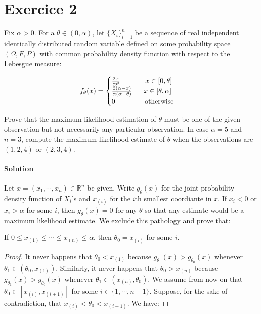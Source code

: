 \documentclass[../main.tex]{subfiles}
\begin{document}
\section{Exercice 2}
\begin{CJK*}{UTF8}{gbsn}
Fix $\alpha > 0$. For a $\theta \in (0, \alpha)$,
let $\{X_i\}_{i=1}^n$ be a sequence of real independent identically distributed random variable 
defined on some probability space $(\Omega, F, P)$
with common probability density function with respect to the Lebesgue measure:

\begin{equation*}
    f_{\theta}(x) = 
    \begin{cases}
        \frac{2x}{\alpha \theta} \tab[1.3cm] x \in [0, \theta] \\
        \frac{2(\alpha-x)}{\alpha(\alpha - \theta)} \tab[0.6cm] x \in [\theta, \alpha] \\
        0 \tab[1.5cm] \text{otherwise}
    \end{cases}
\end{equation*}

Prove that the maximum likelihood estimation of $\theta$ must be one of the given observation
but not necessarily any particular observation. 
In case $\alpha = 5$ and $n=3$, compute the maximum likelihood estimate of $\theta$ when the 
observations are $(1,2,4)$ or $(2,3,4)$.  

\smallskip
\paragraph{Solution}
Let $x = (x_1, \cdots, x_n) \in \mathbb{R}^n$ be given. 
Write $g_{\theta}(x)$ for the joint probability density function of $X_i$'s 
and $x_{(i)}$ for the $i$th smallest coordiante in $x$.
If $x_i < 0$ or $x_i > \alpha$ for some $i$, then $g_{\theta}(x)=0$ for any $\theta$ so that 
any estimate would be a maximum likelihood estimate.
We exclude this pathology and prove that:

\begin{theorem}
If $0 \leqslant x_{(1)} \leqslant \cdots \leqslant x_{(n)} \leqslant \alpha$, then $\theta_0 = x_{(i)}$ for some $i$.
\end{theorem}

\begin{proof}
It never happens that $\theta_0 < x_{(1)}$
because $g_{\theta_1}(x) > g_{\theta_0}(x)$ whenever $\theta_1 \in (\theta_0,x_{(1)})$.
Similarly, it never happens that $\theta_0 > x_{(n)}$ because
$g_{\theta_1}(x) > g_{\theta_0}(x)$ whenever $\theta_1 \in (x_{(n)}, \theta_0)$.
We assume from now on that $\theta_0 \in [x_{(i)}, x_{(i+1)}]$ for some $i \in \{1,\cdots, n-1\}$.
Suppose, for the sake of contradiction, that $x_{(i)} < \theta_0 < x_{(i+1)}$. We have:


\end{proof}
\end{CJK*}
\end{document}
